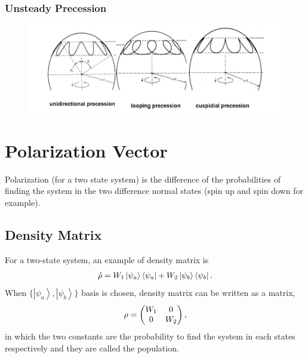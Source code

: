 \documentclass[letterpaper,12pt,english]{sphinxmanual}
\newcommand{\bra}[1]{\left\langle #1\right|}
\newcommand{\ket}[1]{\left| #1\right\rangle}
\begin{document}
\subsubsection{Unsteady Precession}
\label{picture:unsteady-precession}\begin{figure}[htbp]
\centering

\includegraphics{spinningTop.png}
\end{figure}


\section{Polarization Vector}
\label{picture:polarization-vector}
Polarization (for a two state system) is the difference of the probabilities of finding the system in the two difference normal states (spin up and spin down for example).


\subsection{Density Matrix}
\label{picture:density-matrix}
For a two-state system, an example of density matrix is
\begin{gather}
\begin{split}\hat \rho = W_1 \ket{\psi_a}\bra{\psi_a} + W_2 \ket{\psi_b}\bra{\psi_b}.\end{split}\notag
\end{gather}
When \(\{ \ket{\psi_a}, \ket{\psi_b} \}\) basis is chosen, density matrix can be written as a matrix,
\begin{gather}
\begin{split}\mathbf \rho = \begin{pmatrix} W_1 & 0 \\ 0 & W_2 \end{pmatrix},\end{split}\notag
\end{gather}
in which the two constants are the probability to find the system in each states respectively and they are called the population.
\end{document}
